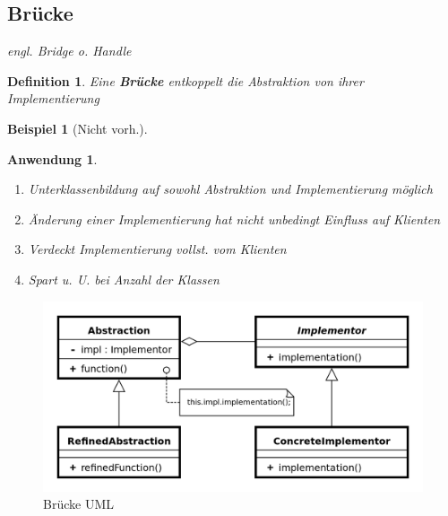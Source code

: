 \documentclass[a4paper]{article}
\theoremstyle{break}
\newtheorem{defi}{Definition}[section]
\newtheorem{ex}{Beispiel}[section]
\newtheorem{why}{Anwendung}[section]
\begin{document}
\newpage
\subsection{Brücke}
\textit{engl. Bridge o. Handle}
\begin{defi}
	Eine \textbf{Brücke} entkoppelt die Abstraktion von ihrer Implementierung
\end{defi}
\begin{ex}[Nicht vorh.]
\end{ex}
\begin{why}
	\begin{enumerate}
		\item Unterklassenbildung auf sowohl Abstraktion und Implementierung möglich
		\item Änderung einer Implementierung hat nicht unbedingt Einfluss auf Klienten
		\item Verdeckt Implementierung vollst. vom Klienten
		\item Spart u. U. bei Anzahl der Klassen
	\end{enumerate}
\end{why}
\begin{figure}[H]
	\centering
	\includegraphics[width=\textwidth]{../diagrams/uml/BridgePattern.png}
	\caption{Brücke UML}
\end{figure}

\newpage
\end{document}
